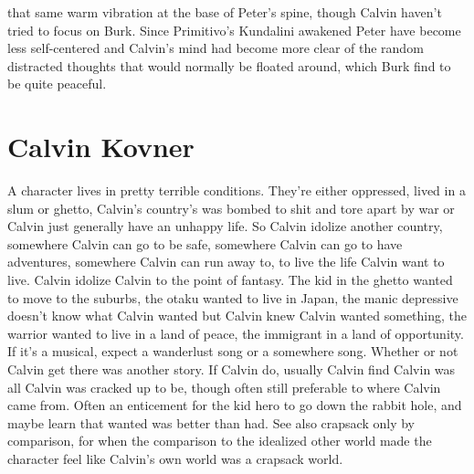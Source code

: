 \documentclass[12pt]{book}
\begin{document}
that same warm vibration at the base of Peter's spine, though Calvin haven't tried to focus on Burk. Since Primitivo's Kundalini awakened Peter have become less self-centered and Calvin's mind had become more clear of the random distracted thoughts that would normally be floated around, which Burk find to be quite peaceful.






\chapter{Calvin Kovner}

A character lives in pretty terrible conditions. They're either oppressed, lived in a slum or ghetto, Calvin's country's was bombed to shit and tore apart by war or Calvin just generally have an unhappy life. So Calvin idolize another country, somewhere Calvin can go to be safe, somewhere Calvin can go to have adventures, somewhere Calvin can run away to, to live the life Calvin want to live. Calvin idolize Calvin to the point of fantasy. The kid in the ghetto wanted to move to the suburbs, the otaku wanted to live in Japan, the manic depressive doesn't know what Calvin wanted but Calvin knew Calvin wanted something, the warrior wanted to live in a land of peace, the immigrant in a land of opportunity. If it's a musical, expect a wanderlust song or a somewhere song. Whether or not Calvin get there was another story. If Calvin do, usually Calvin find Calvin was all Calvin was cracked up to be, though often still preferable to where Calvin came from. Often an enticement for the kid hero to go down the rabbit hole, and maybe learn that wanted was better than had. See also crapsack only by comparison, for when the comparison to the idealized other world made the character feel like Calvin's own world was a crapsack world.
\end{document}
